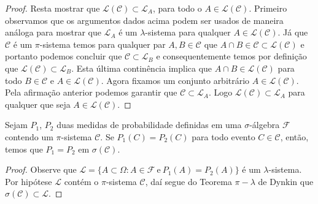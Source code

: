 \begin{proof}
    
    
    Resta mostrar que $ \mathcal{L}(\mathcal{C}) \subset  \mathcal{L}_A$, para todo o 
    $A \in  \mathcal{L}(\mathcal{C})$.
    Primeiro observamos que os argumentos dados acima podem ser usados
    de maneira análoga para mostrar que $\mathcal{L} _A$ é um $\lambda$-sistema
    para qualquer $A\in\mathcal{L}(\mathcal{C})$. 
    Já que $\mathcal{C}$ é um $\pi$-sistema temos
    para qualquer par $A,B \in \mathcal{C}$ 
    que $A \cap B \in \mathcal{C} \subset \mathcal{L}(\mathcal{C})$
    e portanto podemos concluir que $\mathcal{C} \subset\mathcal{L}_B$ 
    e consequentemente temos por definição que
    $\mathcal{L}(\mathcal{C}) \subset \mathcal{L}_B $.
    Esta última continência implica que $A\cap B\in\mathcal{L}(\mathcal{C})$
    para todo $B\in\mathcal{C}$ e $A\in\mathcal{L}(\mathcal{C})$.
    Agora fixamos um conjunto arbitrário $A\in\mathcal{L}(\mathcal{C})$.
    Pela afirmação anterior podemos garantir que 
    $\mathcal{C}\subset \mathcal{L}_{A}$. 
    Logo $\mathcal{L}(\mathcal{C}) \subset \mathcal{L}_A$
    para qualquer que seja $A\in\mathcal{L}(\mathcal{C})$. 
\end{proof}


\begin{corolario}[Unicidade]
    Sejam $P_1$, $P_2$ duas medidas de probabilidade 
    definidas em uma $\sigma$-álgebra $\mathcal{F}$ contendo um 
    $\pi$-sistema $\mathcal{C}$.
    Se $P_1(C)=P_2(C)$ para todo evento 
    $C\in\mathcal{C}$, então, temos que $P_1=P_2$ em
    $\sigma(\mathcal{C})$.
\end{corolario}

\begin{proof}
    Observe que $\mathcal{L}  = \{A \subset \Omega: A\in\mathcal{F}\ 
    \text{e}\ P_1(A) = P_2(A)\}$  é um $\lambda$-sistema. 
    Por hipótese $\mathcal{L}$ contém o $\pi$-sistema $\mathcal{C}$, daí
    segue do Teorema $\pi-\lambda$ de Dynkin que $\sigma(\mathcal{C}) \subset 
    \mathcal{L}$.
\end{proof}

